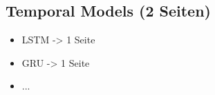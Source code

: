 \subsection{Temporal Models (2 Seiten)}

\begin{itemize}
    \item LSTM -> 1 Seite
    \item GRU -> 1 Seite
    \item ...
\end{itemize}



\clearpage                                                       %





\clearpage                                                       %


